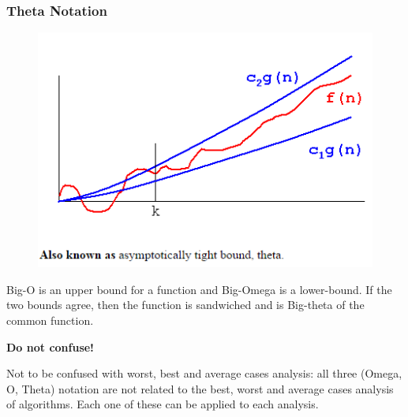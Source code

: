 \documentclass{beamer}
\begin{document}
\begin{frame}
		\frametitle{Theta Notation}
		\large
	\begin{figure}
\centering
\includegraphics[width=0.6\linewidth]{BigTheta}

\end{figure}
Big-O is an upper bound for a function and Big-Omega is a lower-bound.  If the two bounds agree, then the function is sandwiched and is Big-theta of the common function.
\end{frame}
\begin{frame}
\large
\textbf{Do not confuse!}
	
	Not to be confused with worst, best and average cases analysis: all three (Omega, O, Theta) notation are not related to the best, worst and average cases analysis of algorithms. Each one of these can be applied to each analysis.
\end{frame}
\end{document}
